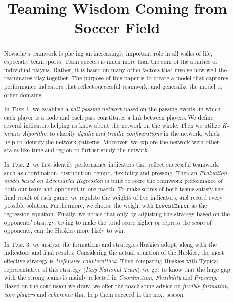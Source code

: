 \documentclass[12pt]{article}  %
\title{Teaming Wisdom Coming from Soccer Field}  %
\begin{document}
\begin{abstract}
    
    Nowadays teamwork is playing an increasingly important role in all walks of life, especially team sports. Team success is much more than the sum of the abilities of individual players. Rather, it is based on many other factors that involve how well the teammates play together. The purpose of this paper is to create a model that captures performance indicators that reflect successful teamwork, and generalize the model to other domains.

In \textsc{Task 1}, we establish a \textit{ball passing network} based on the passing events, in which each player is a node and each pass constitutes a link between players. We define several indicators helping us know about the network on the whole. Then we utilize \textit{K-means Algorithm} to classify \textit{dyadic and triadic configurations} in the network, which help to identify the network patterns. Moreover, we explore the network with other scales like time and region to further study the network.

In \textsc{Task 2}, we first identify performance indicators that reflect successful teamwork, such as coordination, distribution, tempo, flexibility and pressing. Then an \textit{Evaluation model based on Adversarial Regression} is built to score the teamwork performance of both our team and opponent in one match. To make scores of both teams satisfy the final result of each game, we regulate the weights of five indicators, and record every possible solution. Furthermore, we choose the weight with $\mathtt{LowestError}$ as the regression equation. Finally,  we notice that only by adjusting the strategy based on the opponents' strategy, trying to make the total score higher or repress the score of opponents, can the Huskies more likely to win.

In \textsc{Task 3}, we analyze the formations and strategies Huskies adopt, along with the indicators and final results. Considering the actual situation of the Huskies, the most effective strategy is \textit{Defensive counterattack}. Then comparing Huskies with Typical representative of this strategy (\textit{Italy National Team}), we get to know that the huge gap with the strong teams is mainly reflected in \textit{Coordination}, \textit{Flexibility} and \textit{Pressing}. Based on the conclusion we draw, we offer the coach some advice on \textit{flexible formation}, \textit{core players} and \textit{coherence} that help them succeed in the next season. 


\end{abstract}
\end{document}
